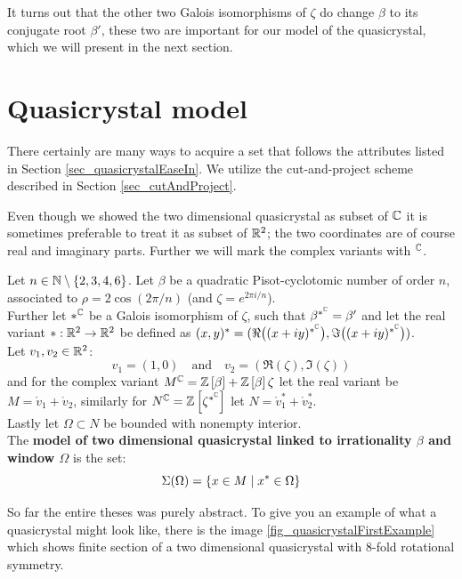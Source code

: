 \documentclass[text.tex]{subfiles}
\begin{document}
It turns out that the other two Galois isomorphisms of $\zeta$ do change $\beta$ to its conjugate root $\beta'$, these two are important for our model of the quasicrystal, which we will present in the next section. 

\section{Quasicrystal model}%
There certainly are many ways to acquire a set that follows the attributes listed in Section \ref{sec_quasicrystalEaseIn}. We utilize the cut-and-project scheme described in Section \ref{sec_cutAndProject}. 

Even though we showed the two dimensional quasicrystal as subset of $\mathbb{C}$ it is sometimes preferable to treat it as subset of $\mathbb{R}^2$; the two coordinates are of course real and imaginary parts. Further we will mark the complex variants with ${}^{\mathbb{C}}$. 

\begin{definition}\label{def_quasicrystal}
Let $n\in\mathbb{N}\setminus\{2,3,4,6\}$. Let $\beta$ be a quadratic Pisot-cyclotomic number of order $n$, associated to $\rho = 2\cos\left(2\pi/n\right)$ (and $\zeta = e^{2\pi i/n}$). \\
Further let $\ast^{\mathbb{C}}$ be a Galois isomorphism of $\zeta$, such that $\beta^{\ast^{\mathbb{C}}} = \beta'$ and let the real variant $\ast:\mathbb{R}^2\to\mathbb{R}^2$ be defined as $(x,y)^\ast = (\Re{\big((x+iy)^{\ast^{\mathbb{C}}}\big)}, \Im{\big((x+iy)^{\ast^{\mathbb{C}}}\big)})$. \\
Let $v_1, v_2\in\mathbb{R}^2$:
$$v_1=(1,0)\quad\text{and}\quad v_2 = (\Re{(\zeta)}, \Im{(\zeta)})$$
and for the complex variant $M^{\mathbb{C}} = \mathbb{Z}\left[\beta\right]+\mathbb{Z}\left[\beta\right]\zeta$ let the real variant be $M = \ring v_1+\ring v_2$, similarly for $N^{\mathbb{C}}=\mathbb{Z}\left[\zeta^{\ast^{\mathbb{C}}}\right]$ let $N = \ring v_1^\ast+\ring v_2^\ast$.\\
Lastly let $\Omega\subset N$ be bounded with nonempty interior. \\
The \textbf{model of two dimensional quasicrystal linked to irrationality $\beta$ and window $\Omega$} is the set:
$$\Sigma(\Omega) = \{ x \in M\; |\; x^\ast\in \Omega\}$$
\end{definition}

So far the entire theses was purely abstract. To give you an example of what a quasicrystal might look like, there is the image \ref{fig_quasicrystalFirstExample} which shows finite section of a two dimensional quasicrystal with $8$-fold rotational symmetry.
\end{document}
